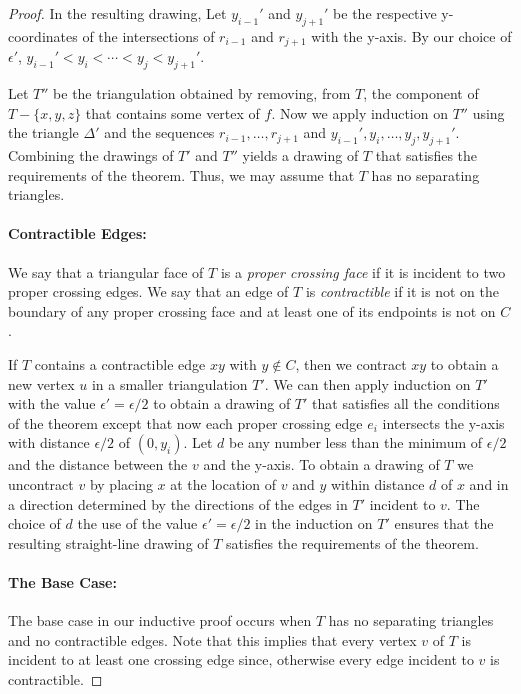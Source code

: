 \documentclass{patmorin}
\begin{document}
\begin{proof}
   In the resulting drawing, Let $y_{i-1}'$ and $y_{j+1}'$ be
   the respective y-coordinates of the intersections of $r_{i-1}$
   and $r_{j+1}$ with the y-axis.  By our choice of $\epsilon'$,
   $y_{i-1}'<y_i<\cdots<y_j<y_{j+1}'$.

   Let $T''$ be the triangulation obtained by removing, from $T$, the
   component of $T-\{x,y,z\}$ that contains some vertex of $f$.  Now we
   apply induction on $T''$ using the triangle $\Delta'$ and the sequences
   $r_{i-1},\ldots,r_{j+1}$ and $y_{i-1}',y_i,\ldots,y_{j},y_{j+1}'$.
   Combining the drawings of $T'$ and $T''$ yields a drawing of $T$
   that satisfies the requirements of the theorem.  Thus, we may assume
   that $T$ has no separating triangles.

   \paragraph{Contractible Edges:}
   We say that a triangular face of $T$ is a \emph{proper crossing face}
   if it is incident to two proper crossing edges.  We say that an edge
   of $T$ is \emph{contractible} if it is not on the boundary of any
   proper crossing face and at least one of its endpoints is not on $C$.

   If $T$ contains a contractible edge $xy$ with $y\not\in C$,
   then we contract $xy$ to obtain a new vertex $u$ in a smaller
   triangulation $T'$.   We can then apply induction on $T'$ with
   the value $\epsilon'=\epsilon/2$ to obtain a drawing of $T'$ that
   satisfies all the conditions of the theorem except that now each proper
   crossing edge $e_i$ intersects the y-axis with distance $\epsilon/2$ of
   $(0,y_i)$.  Let $d$ be any number less than the minimum of $\epsilon/2$
   and the distance between the $v$ and the y-axis.  To obtain a drawing
   of $T$ we uncontract $v$ by placing $x$ at the location of $v$ and
   $y$ within distance $d$ of $x$ and in a direction determined by the
   directions of the edges in $T'$ incident to $v$.  The choice of $d$
   the use of the value $\epsilon'=\epsilon/2$ in the induction on $T'$
   ensures that the resulting straight-line drawing of $T$ satisfies
   the requirements of the theorem.

   \paragraph{The Base Case:}
   The base case in our inductive proof occurs when $T$ has no separating
   triangles and no contractible edges.  Note that this implies that
   every vertex $v$ of $T$ is incident to at least one crossing edge
   since, otherwise every edge incident to $v$ is contractible.
  

\end{proof}
\end{document}
